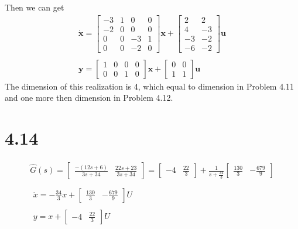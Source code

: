 \documentclass{article}
\begin{document}
Then we can get
$$
\begin{array}{l}
\dot{\pmb{x}}=\left[\begin{array}{cccc}
-3 & 1 & 0 & 0 \\
-2 & 0 & 0 & 0 \\
0 & 0 & -3 & 1 \\
0 & 0 & -2 & 0
\end{array}\right] \pmb{x}+\left[\begin{array}{cc}
2 & 2 \\
4 & -3 \\
-3 & -2 \\
-6 & -2
\end{array}\right] \pmb{u} \\
~\\
\pmb{y}=\left[\begin{array}{llll}
1 & 0 & 0 & 0 \\
0 & 0 & 1 & 0
\end{array}\right] \pmb{x}+\left[\begin{array}{ll}
0 & 0 \\
1 & 1
\end{array}\right] \pmb{u}
\end{array}
$$
The dimension of this realization is 4, which equal to dimension in Problem 4.11 and one more then dimension in Problem 4.12.
\section*{4.14}
$$
\begin{array}{l}
\hat{G}(s)=\begin{bmatrix}\frac{-(12 s+6)}{3 s+34}& \frac{22 s+23}{3 s+34}\end{bmatrix}=\left[\begin{array}{ll}
-4 & \frac{22}{3}
\end{array}\right]+\frac{1}{s+\frac{34}{3}}\left[\begin{array}{ll}
\frac{130}{3} & -\frac{679}{9}
\end{array}\right] \\
~\\
\begin{array}{l}
\dot{x}=-\frac{34}{3} x+\begin{bmatrix}\frac{130}{3} &-\frac{679}{9}\end{bmatrix} U \\
~\\
y=x+\begin{bmatrix}-4 & \frac{22}{3}\end{bmatrix} U
\end{array}
\end{array}
$$
\end{document}
